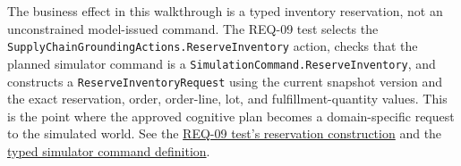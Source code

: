 The business effect in this walkthrough is a typed inventory reservation, not an unconstrained model-issued command. The REQ-09 test selects the \texttt{SupplyChainGroundingActions.ReserveInventory} action, checks that the planned simulator command is a \texttt{SimulationCommand.ReserveInventory}, and constructs a \texttt{ReserveInventoryRequest} using the current snapshot version and the exact reservation, order, order-line, lot, and fulfillment-quantity values. This is the point where the approved cognitive plan becomes a domain-specific request to the simulated world. See the \href{https://github.com/haythemabr/supply-chain-agent/blob/6329aec82e1d8b4f19b68986a0d4cf0c448f697f/supply-chain-agent-evaluation/src/test/java/dev/supplychain/agent/evaluation/DurableCognitiveApplicationHostEndToEndPostgresIntegrationTest.java\#L862-L883}{REQ-09 test's reservation construction} and the \href{https://github.com/haythemabr/supply-chain-agent/blob/6329aec82e1d8b4f19b68986a0d4cf0c448f697f/supply-chain-agent-simulator/src/main/java/dev/supplychain/agent/simulator/command/SimulationCommand.java}{typed simulator command definition}.

